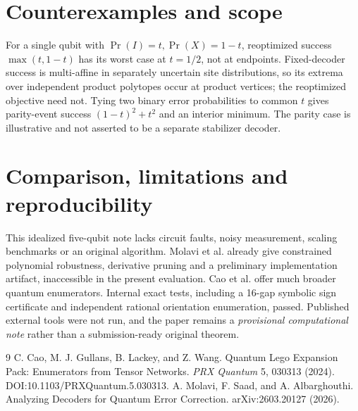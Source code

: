 \documentclass{article}
\begin{document}
\section{Counterexamples and scope}
For a single qubit with $\Pr(I)=t,\Pr(X)=1-t$, reoptimized success $\max(t,1-t)$ has its worst case at $t=1/2$, not at endpoints. Fixed-decoder success is multi-affine in separately uncertain site distributions, so its extrema over independent product polytopes occur at product vertices; the reoptimized objective need not. Tying two binary error probabilities to common $t$ gives parity-event success $(1-t)^2+t^2$ and an interior minimum. The parity case is illustrative and not asserted to be a separate stabilizer decoder.
\section{Comparison, limitations and reproducibility}
This idealized five-qubit note lacks circuit faults, noisy measurement, scaling benchmarks or an original algorithm. Molavi et al. already give constrained polynomial robustness, derivative pruning and a preliminary implementation artifact, inaccessible in the present evaluation. Cao et al. offer much broader quantum enumerators. Internal exact tests, including a 16-gap symbolic sign certificate and independent rational orientation enumeration, passed. Published external tools were not run, and the paper remains a \emph{provisional computational note} rather than a submission-ready original theorem.
\begin{thebibliography}{9}
 C. Cao, M. J. Gullans, B. Lackey, and Z. Wang. Quantum Lego Expansion Pack: Enumerators from Tensor Networks. \emph{PRX Quantum} 5, 030313 (2024). DOI:10.1103/PRXQuantum.5.030313.
 A. Molavi, F. Saad, and A. Albarghouthi. Analyzing Decoders for Quantum Error Correction. arXiv:2603.20127 (2026).
\end{thebibliography}
\end{document}

